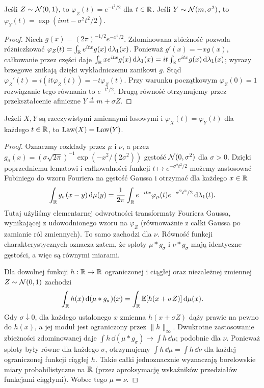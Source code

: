 \begin{lemat}
Jeśli $Z\sim\mathcal{N}(0,1)$, to
$\varphi_Z(t)=e^{-t^2/2}$ dla $t\in\mathbb{R}$.
Jeśli $Y\sim\mathcal{N}(m,\sigma^2)$, to
$\varphi_Y(t)=\exp(imt-\sigma^2t^2/2)$.
\end{lemat}
\begin{proof}
Niech $g(x)=(2\pi)^{-1/2}e^{-x^2/2}$.
Zdominowana zbieżność pozwala różniczkować
$\varphi_Z(t)=\int_{\mathbb{R}} e^{itx}g(x)\,\mathrm{d}\lambda_1(x)$.
Ponieważ $g'(x)=-xg(x)$, całkowanie przez części daje
$\int_{\mathbb{R}} xe^{itx}g(x)\,\mathrm{d}\lambda_1(x)
=it\int_{\mathbb{R}} e^{itx}g(x)\,\mathrm{d}\lambda_1(x)$;
wyrazy brzegowe znikają dzięki wykładniczemu zanikowi $g$.
Stąd $\varphi_Z'(t)=i(it\varphi_Z(t))=-t\varphi_Z(t)$.
Przy warunku początkowym $\varphi_Z(0)=1$ rozwiązanie tego
równania to $e^{-t^2/2}$. Drugą równość otrzymujemy
przez przekształcenie afiniczne $Y\stackrel d=m+\sigma Z$.
\end{proof}

\begin{twierdzenie}
Jeżeli $X,Y$ są rzeczywistymi zmiennymi losowymi i
$\varphi_X(t)=\varphi_Y(t)$ dla każdego $t\in\mathbb{R}$,
to $\operatorname{Law}(X)=\operatorname{Law}(Y)$.
\end{twierdzenie}
\begin{proof}
Oznaczmy rozkłady przez $\mu$ i $\nu$, a przez
$g_\sigma(x)=(\sigma\sqrt{2\pi})^{-1}
\exp(-x^2/(2\sigma^2))$ gęstość $\mathcal{N}(0,\sigma^2)$
dla $\sigma>0$. Dzięki poprzedniemu lematowi i
całkowalności funkcji $t\mapsto e^{-\sigma^2t^2/2}$
możemy zastosować Fubiniego do wzoru Fouriera na gęstość
Gaussa i otrzymać dla każdego $x\in\mathbb{R}$
\[
\int_{\mathbb{R}} g_\sigma(x-y)\,\mathrm{d}\mu(y)
=\frac1{2\pi}\int_{\mathbb{R}}
 e^{-itx}\varphi_\mu(t)e^{-\sigma^2t^2/2}
\,\mathrm{d}\lambda_1(t).
\]
Tutaj użyliśmy elementarnej odwrotności transformaty
Fouriera Gaussa, wynikającej z udowodnionego wzoru na
$\varphi_Z$ (równoważnie z całki Gaussa po zamianie
ról zmiennych). To samo zachodzi dla $\nu$.
Równość funkcji charakterystycznych oznacza zatem,
że sploty $\mu*g_\sigma$ i $\nu*g_\sigma$ mają
identyczne gęstości, a więc są równymi miarami.

Dla dowolnej funkcji $h:\mathbb{R}\to\mathbb{R}$ ograniczonej i ciągłej
oraz niezależnej zmiennej $Z\sim\mathcal{N}(0,1)$ zachodzi
\[
\int_{\mathbb{R}} h(x)\,\mathrm{d}(\mu*g_\sigma)(x)
=\int_{\mathbb{R}}\mathbb{E}[h(x+\sigma Z)]\,\mathrm{d}\mu(x).
\]
Gdy $\sigma\downarrow0$, dla każdego ustalonego $x$
zmienna $h(x+\sigma Z)$ dąży prawie na pewno do $h(x)$,
a jej moduł jest ograniczony przez $\|h\|_\infty$.
Dwukrotne zastosowanie zbieżności zdominowanej daje
$\int h\,\dd(\mu*g_\sigma)\to\int h\,\dd\mu$;
podobnie dla $\nu$. Ponieważ sploty były równe dla
każdego $\sigma$, otrzymujemy
$\int h\,\dd\mu=\int h\,\dd\nu$ dla każdej
ograniczonej funkcji ciągłej $h$. Takie całki
jednoznacznie wyznaczają borelowskie miary probabilistyczne
na $\mathbb{R}$ (przez aproksymację wskaźników przedziałów
funkcjami ciągłymi). Wobec tego $\mu=\nu$.
\end{proof}

